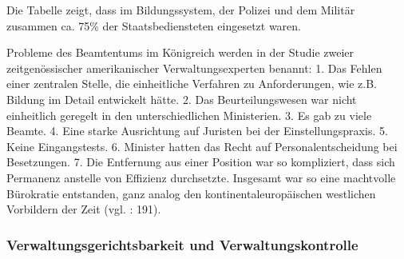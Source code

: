 Die Tabelle zeigt, dass im Bildungssystem, der Polizei und dem Militär zusammen ca. 75\% der Staatsbediensteten eingesetzt waren.\par
Probleme des Beamtentums im Königreich werden in der Studie zweier zeitgenössischer amerikanischer Verwaltungsexperten benannt: 1. Das Fehlen einer zentralen Stelle, die einheitliche Verfahren zu Anforderungen, wie z.B. Bildung im Detail entwickelt hätte. 2. Das Beurteilungswesen war nicht einheitlich geregelt in den unterschiedlichen Ministerien. 3. Es gab zu viele Beamte. 4. Eine starke Ausrichtung auf Juristen bei der Einstellungspraxis. 5. Keine Eingangstests. 6. Minister hatten das Recht auf Personalentscheidung bei Besetzungen. 7. Die Entfernung aus einer Position war so kompliziert, dass sich Permanenz anstelle von Effizienz durchsetzte. Insgesamt war so eine machtvolle Bürokratie entstanden, ganz analog den kontinentaleuropäischen westlichen Vorbildern der Zeit (vgl. \cite{beardradin} : 191).

\subsubsection{Verwaltungsgerichtsbarkeit und Verwaltungskontrolle}

